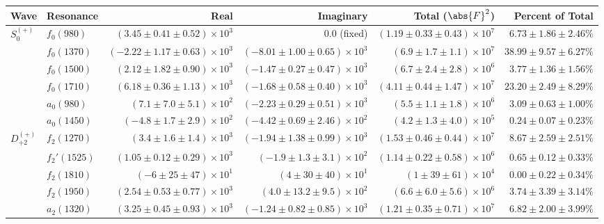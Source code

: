 \begin{table}[ht]
    \begin{center}
        \begin{tabular}{llrrrr}\toprule
        Wave & Resonance & Real & Imaginary & Total ($\abs{F}^2$) & Percent of Total \\\midrule
$S_{0}^{(+)}$ & $f_{0}(980)$ & $(3.45 \pm 0.41 \pm 0.52) \times 10^{3}$ & $0.0$ (fixed) & $(1.19 \pm 0.33 \pm 0.43) \times 10^{7}$ & $6.73 \pm 1.86 \pm 2.46 \%$ \\
 & $f_{0}(1370)$ & $(-2.22 \pm 1.17 \pm 0.63) \times 10^{3}$ & $(-8.01 \pm 1.00 \pm 0.65) \times 10^{3}$ & $(6.9 \pm 1.7 \pm 1.1) \times 10^{7}$ & $38.99 \pm 9.57 \pm 6.27 \%$ \\
 & $f_{0}(1500)$ & $(2.12 \pm 1.82 \pm 0.90) \times 10^{3}$ & $(-1.47 \pm 0.27 \pm 0.47) \times 10^{3}$ & $(6.7 \pm 2.4 \pm 2.8) \times 10^{6}$ & $3.77 \pm 1.36 \pm 1.56 \%$ \\
 & $f_{0}(1710)$ & $(6.18 \pm 0.36 \pm 1.13) \times 10^{3}$ & $(-1.68 \pm 0.58 \pm 0.40) \times 10^{3}$ & $(4.11 \pm 0.44 \pm 1.47) \times 10^{7}$ & $23.20 \pm 2.49 \pm 8.29 \%$ \\
 & $a_{0}(980)$ & $(7.1 \pm 7.0 \pm 5.1) \times 10^{2}$ & $(-2.23 \pm 0.29 \pm 0.51) \times 10^{3}$ & $(5.5 \pm 1.1 \pm 1.8) \times 10^{6}$ & $3.09 \pm 0.63 \pm 1.00 \%$ \\
 & $a_{0}(1450)$ & $(-4.8 \pm 1.7 \pm 2.9) \times 10^{2}$ & $(-4.42 \pm 0.69 \pm 2.46) \times 10^{2}$ & $(4.2 \pm 1.3 \pm 4.0) \times 10^{5}$ & $0.24 \pm 0.07 \pm 0.23 \%$ \\
$D_{+2}^{(+)}$ & $f_{2}(1270)$ & $(3.4 \pm 1.6 \pm 1.4) \times 10^{3}$ & $(-1.94 \pm 1.38 \pm 0.99) \times 10^{3}$ & $(1.53 \pm 0.46 \pm 0.44) \times 10^{7}$ & $8.67 \pm 2.59 \pm 2.51 \%$ \\
 & $f_{2}'(1525)$ & $(1.05 \pm 0.12 \pm 0.29) \times 10^{3}$ & $(-1.9 \pm 1.3 \pm 3.1) \times 10^{2}$ & $(1.14 \pm 0.22 \pm 0.58) \times 10^{6}$ & $0.65 \pm 0.12 \pm 0.33 \%$ \\
 & $f_{2}(1810)$ & $(-6 \pm 25 \pm 47) \times 10^{1}$ & $(4 \pm 30 \pm 40) \times 10^{1}$ & $(1 \pm 39 \pm 61) \times 10^{4}$ & $0.00 \pm 0.22 \pm 0.34 \%$ \\
 & $f_{2}(1950)$ & $(2.54 \pm 0.53 \pm 0.77) \times 10^{3}$ & $(4.0 \pm 13.2 \pm 9.5) \times 10^{2}$ & $(6.6 \pm 6.0 \pm 5.6) \times 10^{6}$ & $3.74 \pm 3.39 \pm 3.14 \%$ \\
 & $a_{2}(1320)$ & $(3.25 \pm 0.45 \pm 0.93) \times 10^{3}$ & $(-1.24 \pm 0.82 \pm 0.85) \times 10^{3}$ & $(1.21 \pm 0.35 \pm 0.71) \times 10^{7}$ & $6.82 \pm 2.00 \pm 3.99 \%$ \\

\end{tabular}
\end{center}
\end{table}
